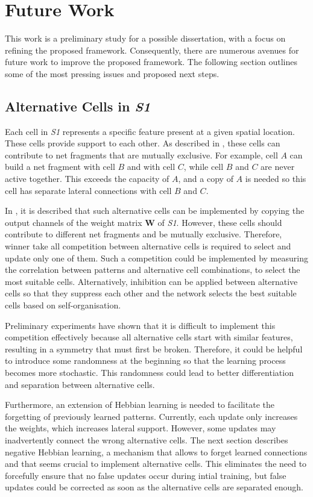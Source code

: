 \section{Future Work}
This work is a preliminary study for a possible dissertation, with a focus on refining the proposed framework.
Consequently, there are numerous avenues for future work to improve the proposed framework. The following section outlines some of the most pressing issues and proposed next steps.

\subsection{Alternative Cells in \emph{S1}}
Each cell in \emph{S1} represents a specific feature present at a given spatial location.
These cells provide support to each other.
As described in , these cells can contribute to net fragments that are mutually exclusive.
For example, cell $A$ can build a net fragment with cell $B$ and with cell $C$, while cell $B$ and $C$ are never active together.
This exceeds the capacity of $A$, and a copy of $A$ is needed so this cell has separate lateral connections with cell $B$ and $C$. 

In , it is described that such alternative cells can be implemented by copying the output channels of the weight matrix $\boldsymbol{W}$ of \emph{S1}.
However, these cells should contribute to different net fragments and be mutually exclusive.
Therefore, winner take all competition between alternative cells is required to select and update only one of them.
Such a competition could be implemented by measuring the correlation between patterns and alternative cell combinations, to select the most suitable cells.
Alternatively, inhibition can be applied between alternative cells so that they suppress each other and the network selects the best suitable cells based on self-organisation.

Preliminary experiments have shown that it is difficult to implement this competition effectively because all alternative cells start with similar features, resulting in a symmetry that must first be broken.
Therefore, it could be helpful to introduce some randomness at the beginning so that the learning process becomes more stochastic.
This randomness could lead to better differentiation and separation between alternative cells.

Furthermore, an extension of Hebbian learning is needed to facilitate the forgetting of previously learned patterns.
Currently, each update only increases the weights, which increases lateral support. However, some updates may inadvertently connect the wrong alternative cells. 
The next section describes negative Hebbian learning, a mechanism that allows to forget learned connections and that seems crucial to implement alternative cells.
This eliminates the need to forcefully ensure that no false updates occur during intial training, but false updates could be corrected as soon as the alternative cells are separated enough.



